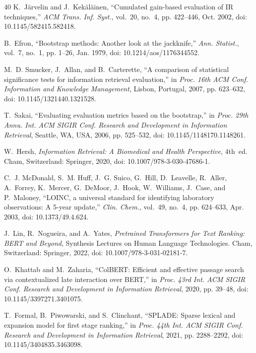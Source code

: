 \documentclass[journal,twoside,web]{ieeecolor}
\begin{document}
\begin{thebibliography}{40}
K.~J\"{a}rvelin and J.~Kek\"{a}l\"{a}inen, ``Cumulated gain-based evaluation of IR
techniques,'' \emph{ACM Trans. Inf. Syst.}, vol.~20, no.~4, pp. 422--446,
Oct. 2002, doi: 10.1145/582415.582418.

B.~Efron, ``Bootstrap methods: Another look at the jackknife,''
\emph{Ann. Statist.}, vol.~7, no.~1, pp. 1--26, Jan. 1979,
doi: 10.1214/aos/1176344552.

M.~D. Smucker, J.~Allan, and B.~Carterette, ``A comparison of statistical
significance tests for information retrieval evaluation,'' in \emph{Proc. 16th
ACM Conf. Information and Knowledge Management}, Lisbon, Portugal, 2007,
pp. 623--632, doi: 10.1145/1321440.1321528.

T.~Sakai, ``Evaluating evaluation metrics based on the bootstrap,'' in
\emph{Proc. 29th Annu. Int. ACM SIGIR Conf. Research and Development in
Information Retrieval}, Seattle, WA, USA, 2006, pp. 525--532,
doi: 10.1145/1148170.1148261.

W.~Hersh, \emph{Information Retrieval: A Biomedical and Health Perspective},
4th~ed. Cham, Switzerland: Springer, 2020,
doi: 10.1007/978-3-030-47686-1.

C.~J. McDonald, S.~M. Huff, J.~G. Suico, G.~Hill, D.~Leavelle, R.~Aller,
A.~Forrey, K.~Mercer, G.~DeMoor, J.~Hook, W.~Williams, J.~Case, and P.~Maloney,
``LOINC, a universal standard for identifying laboratory observations: A 5-year
update,'' \emph{Clin. Chem.}, vol.~49, no.~4, pp. 624--633, Apr. 2003,
doi: 10.1373/49.4.624.

J.~Lin, R.~Nogueira, and A.~Yates, \emph{Pretrained Transformers for Text
Ranking: BERT and Beyond}, Synthesis Lectures on Human Language Technologies.
Cham, Switzerland: Springer, 2022, doi: 10.1007/978-3-031-02181-7.

O.~Khattab and M.~Zaharia, ``ColBERT: Efficient and effective passage search via
contextualized late interaction over BERT,'' in \emph{Proc. 43rd Int. ACM SIGIR
Conf. Research and Development in Information Retrieval}, 2020, pp. 39--48,
doi: 10.1145/3397271.3401075.

T.~Formal, B.~Piwowarski, and S.~Clinchant, ``SPLADE: Sparse lexical and
expansion model for first stage ranking,'' in \emph{Proc. 44th Int. ACM SIGIR
Conf. Research and Development in Information Retrieval}, 2021, pp. 2288--2292,
doi: 10.1145/3404835.3463098.


\end{thebibliography}
\end{document}
